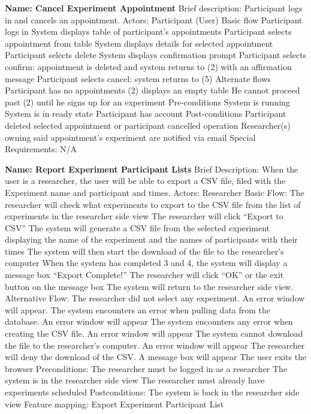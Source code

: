 \begin{outline}[enumerate]
\1 {\bf Name: Cancel Experiment Appointment}
\2 Brief description: Participant logs in and cancels an appointment.
\2 Actors: Participant (User)
\2 Basic flow
\3 Participant logs in
\3 System displays table of participant's appointments
\3 Participant selects appointment from table
\3 System displays details for selected appointment
\3 Participant selects delete
\3 System displays confirmation prompt
\3 Participant selects confirm: appointment is deleted and system returns to (2) with an affirmation message
\3 Participant selects cancel: system returns to (5)
\2 Alternate flows
\3 Participant has no appointments
\4 (2) displays an empty table
\4 He cannot proceed past (2) until he signs up for an experiment
\2 Pre-conditions
\3 System is running
\3 System is in ready state
\3 Participant has account
\2 Post-conditions
\3 Participant deleted selected appointment or participant cancelled operation
\3 Researcher(s) owning said appointment's experiment are notified via email
\2 Special Requirements:
\3 N/A


\1 {\bf Name: Report Experiment Participant Lists}
\2 Brief Description:  When the user is a researcher, the user will be able to export a CSV file, filed with the Experiment name and participant and times.
\2 Actors: Researcher
\2 Basic Flow:
\3 The researcher will check what experiments to export to the CSV file from the list of experiments in the researcher side view
\3 The researcher will click “Export to CSV”
\3 The system will generate a CSV file from the selected experiment displaying the name of the experiment and the names of participants with their times
\3 The system will then start the download of the file to the researcher's computer
\3 When the system has completed 3 and 4, the system will display a message box “Export Complete!”
\3 The researcher will click “OK” or the exit button on the message box
\3 The system will return to the researcher side view.
\2 Alternative Flow:
\3 The researcher did not select any experiment.  An error window will appear.
\3 The system encounters an error when pulling data from the database. An error window will appear
\3 The system encounters any error when creating the CSV file. An error window will appear
\3 The system cannot download the file to the researcher’s computer. An error window will appear
\3 The researcher will deny the download of the CSV.  A message box will appear
\3 The user exits the browser
\2 Preconditions:
\3 The researcher must be logged in as a researcher
\3 The system is in the researcher side view
\3 The researcher must already have experiments scheduled
\2 Postconditions:
\3 The system is back in the researcher side view
\2 Feature mapping:
\3 Export Experiment Participant List


\end{outline}
